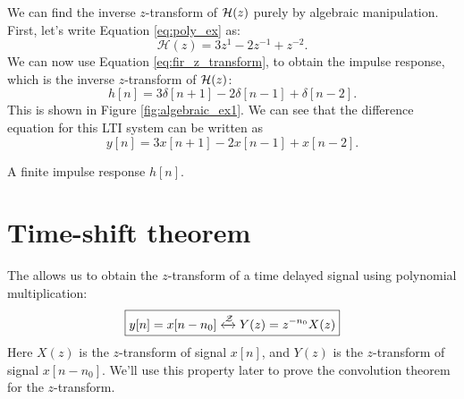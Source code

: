 \noindent We can find the inverse $z$-transform of $\mathcal{H}(z)$ purely by algebraic
manipulation. First, let's write Equation \ref{eq:poly_ex} as:
\begin{equation}
  \mathcal{H}(z) = 3z^{1} - 2z^{-1}  + z^{-2}.
\end{equation}
We can now use Equation \ref{eq:fir_z_transform}, to obtain the impulse
response, which is the inverse $z$-transform of $\mathcal{H}(z)$:
\begin{equation}
  h[n] = 3\delta[n+1] - 2\delta[n-1] + \delta[n-2].
\end{equation}
This is shown in Figure \ref{fig:algebraic_ex1}. We can see that the
difference equation for this LTI system can be written as
\begin{equation}
  y[n] = 3x[n+1]-2x[n-1]+ x[n-2].
\end{equation}
\begin{marginfigure}
  \begin{center}
  \end{center}
  \caption{A finite impulse response $h[n]$.}
  \label{fig:algebraic_ex1}
\end{marginfigure}


\section{Time-shift theorem}
The  allows us to obtain
the $z$-transform of a time delayed signal using polynomial multiplication:
\begin{equation}
  \boxed{
    y[n] = x[n-n_0] \xleftrightarrow{\mathcal{Z}} Y(z) = z^{-n_0}X(z)
  }
\end{equation}
Here $X(z)$ is the $z$-transform of signal $x[n]$, and $Y(z)$ is the
$z$-transform of signal $x[n-n_0]$. We'll use this property later to
prove the convolution theorem for the $z$-transform.

